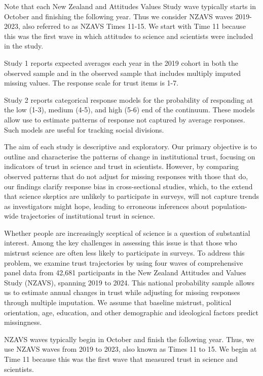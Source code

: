 \documentclass[
  single column]{article}
\begin{document}
Note that each New Zealand and Attitudes Values Study wave typically
starts in October and finishing the following year. Thus we consider
NZAVS waves 2019-2023, also referred to as NZAVS Times 11-15. We start
with Time 11 because this was the first wave in which attitudes to
science and scientists were included in the study.

Study 1 reports expected averages each year in the 2019 cohort in both
the observed sample and in the observed sample that includes multiply
imputed missing values. The response scale for trust items is 1-7.

Study 2 reports categorical response models for the probability of
responding at the low (1-3), medium (4-5), and high (5-6) end of the
continuum. These models allow use to estimate patterns of response not
captured by average responses. Such models are useful for tracking
social divisions.

The aim of each study is descriptive and exploratory. Our primary
objective is to outline and characterise the patterns of change in
institutional trust, focusing on indicators of trust in science and
trust in scientists. However, by comparing observed patterns that do not
adjust for missing responses with those that do, our findings clarify
response bias in cross-sectional studies, which, to the extend that
science skeptics are unlikely to participate in surveys, will not
capture trends as investigators might hope, leading to erroneous
inferences about population-wide trajectories of institutional trust in
science.

Whether people are increasingly sceptical of science is a question of
substantial interest. Among the key challenges in assessing this issue
is that those who mistrust science are often less likely to participate
in surveys. To address this problem, we examine trust trajectories by
using four waves of comprehensive panel data from 42,681 participants in
the New Zealand Attitudes and Values Study (NZAVS), spanning 2019 to
2024. This national probability sample allows us to estimate annual
changes in trust while adjusting for missing responses through multiple
imputation. We assume that baseline mistrust, political orientation,
age, education, and other demographic and ideological factors predict
missingness.

NZAVS waves typically begin in October and finish the following year.
Thus, we use NZAVS waves from 2019 to 2023, also known as Times 11 to
15. We begin at Time 11 because this was the first wave that measured
trust in science and scientists.
\end{document}
